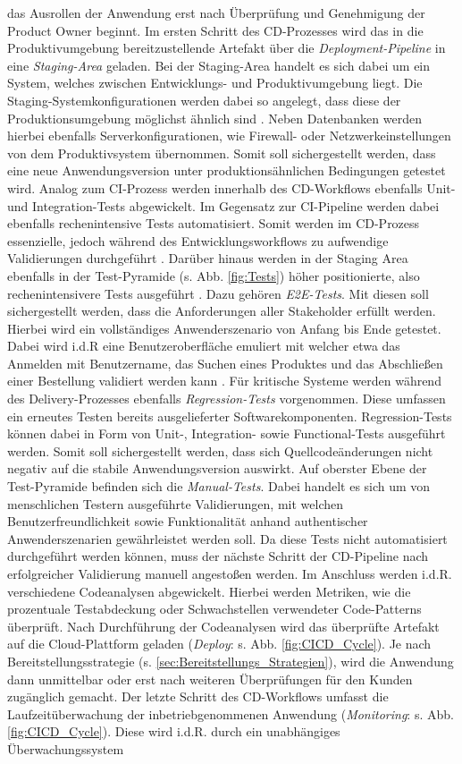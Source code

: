 das Ausrollen der Anwendung erst nach Überprüfung und Genehmigung der Product Owner beginnt. Im ersten Schritt des CD-Prozesses wird das in die Produktivumgebung bereitzustellende Artefakt über die \textit{Deployment-Pipeline} in eine \textit{Staging-Area} geladen. Bei der Staging-Area handelt es sich dabei um ein System, welches zwischen Entwicklungs- und Produktivumgebung liegt. Die Staging-Systemkonfigurationen werden dabei so angelegt, dass diese der Produktionsumgebung möglichst ähnlich sind \cite[Kap. 1.3]{Labouardy.2021}. Neben Datenbanken werden hierbei ebenfalls Serverkonfigurationen, wie Firewall- oder Netzwerkeinstellungen von dem Produktivsystem übernommen. Somit soll sichergestellt werden, dass eine neue Anwendungsversion unter produktionsähnlichen Bedingungen getestet wird. Analog zum CI-Prozess werden innerhalb des CD-Workflows ebenfalls Unit- und Integration-Tests abgewickelt. Im Gegensatz zur CI-Pipeline werden dabei ebenfalls rechenintensive Tests automatisiert. Somit werden im CD-Prozess essenzielle, jedoch während des Entwicklungsworkflows zu aufwendige Validierungen durchgeführt \cite[20]{Halstenberg.2020}. Darüber hinaus werden in der Staging Area ebenfalls in der Test-Pyramide (s. Abb. \ref{fig:Tests}) höher positionierte, also rechenintensivere Tests ausgeführt \cite[Kap. 2]{Hambling.2015}. Dazu gehören \textit{\ac{E2E-Tests}}. Mit diesen soll sichergestellt werden, dass die Anforderungen aller Stakeholder erfüllt werden. Hierbei wird ein vollständiges Anwenderszenario von Anfang bis Ende getestet. Dabei wird i.d.R eine Benutzeroberfläche emuliert mit welcher etwa das Anmelden mit Benutzername, das Suchen eines Produktes und das Abschließen einer Bestellung validiert werden kann \cite{Bose.20230220}. Für kritische Systeme werden während des Delivery-Prozesses ebenfalls \textit{Regression-Tests} vorgenommen. Diese umfassen ein erneutes Testen bereits ausgelieferter Softwarekomponenten. Regression-Tests können dabei in Form von Unit-, Integration- sowie Functional-Tests ausgeführt werden. Somit soll sichergestellt werden, dass sich Quellcodeänderungen nicht negativ auf die stabile Anwendungsversion auswirkt. Auf oberster Ebene der Test-Pyramide befinden sich die \textit{Manual-Tests}. Dabei handelt es sich um von menschlichen Testern ausgeführte Validierungen, mit welchen Benutzerfreundlichkeit sowie Funktionalität anhand authentischer Anwenderszenarien gewährleistet werden soll. Da diese Tests nicht automatisiert durchgeführt werden können, muss der nächste Schritt der CD-Pipeline nach erfolgreicher Validierung manuell angestoßen werden. Im Anschluss werden i.d.R. verschiedene Codeanalysen abgewickelt. Hierbei werden Metriken, wie die prozentuale Testabdeckung oder Schwachstellen verwendeter Code-Patterns überprüft. Nach Durchführung der Codeanalysen wird das überprüfte Artefakt auf die Cloud-Plattform geladen (\textit{Deploy}: s. Abb. \ref{fig:CICD_Cycle}). Je nach Bereitstellungsstrategie (s. \ref{sec:Bereitstellungs_Strategien}), wird die Anwendung dann unmittelbar oder erst nach weiteren Überprüfungen für den Kunden zugänglich gemacht. Der letzte Schritt des CD-Workflows umfasst die Laufzeitüberwachung der inbetriebgenommenen Anwendung (\textit{Monitoring}: s. Abb. \ref{fig:CICD_Cycle}). Diese wird i.d.R. durch ein unabhängiges Überwachungssystem 